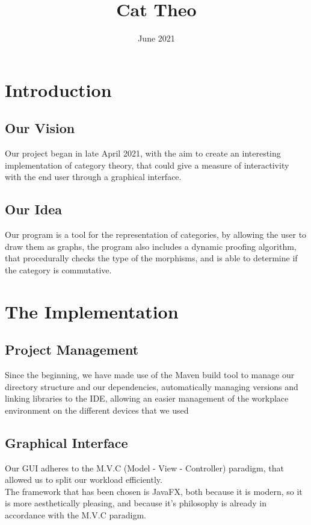 \documentclass{article}
\title{Cat Theo}
\date{June 2021}
\begin{document}
\maketitle
\tableofcontents

\section{Introduction}
    \subsection{Our Vision}
        Our project began in late April 2021, with the aim to create an interesting implementation of category theory, that could give a measure of interactivity with the end user through a graphical interface.
        
    \subsection{Our Idea}
        Our program is a tool for the representation of categories, by allowing the user to draw them as graphs, the program also includes a dynamic proofing algorithm, that procedurally checks the type of the morphisms, and is able to determine if the category is commutative.
        
\section{The Implementation}
    \subsection{Project Management}
        Since the beginning, we have made use of the Maven build tool to manage our directory structure and our dependencies, automatically managing versions and linking libraries to the IDE, allowing an easier management of the workplace environment on the different devices that we used

    \subsection{Graphical Interface}
        Our GUI adheres to the M.V.C (Model - View - Controller) paradigm, that allowed us to split our workload efficiently. \\
        The framework that has been chosen is JavaFX, both because it is modern, so it is more aesthetically pleasing, and because it's philosophy is already in accordance with the M.V.C paradigm.
        
\end{document}
